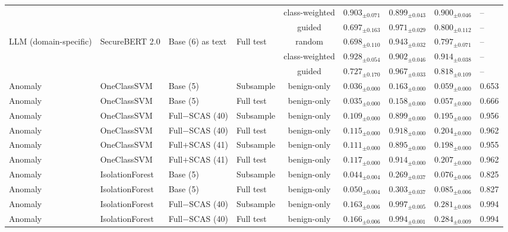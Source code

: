 \begin{longtable}{llllcccc}
 &  &  &  & class-weighted & $0.903_{\pm 0.071}$ & $0.899_{\pm 0.043}$ & $0.900_{\pm 0.046}$ & -- \\
 &  &  &  & guided & $0.697_{\pm 0.163}$ & $0.971_{\pm 0.029}$ & $0.800_{\pm 0.112}$ & -- \\
\addlinespace
LLM (domain-specific) & SecureBERT 2.0 & Base (6) as text & Full test & random & $0.698_{\pm 0.110}$ & $0.943_{\pm 0.032}$ & $0.797_{\pm 0.071}$ & -- \\
 &  &  &  & class-weighted & $0.928_{\pm 0.054}$ & $0.902_{\pm 0.046}$ & $0.914_{\pm 0.038}$ & -- \\
 &  &  &  & guided & $0.727_{\pm 0.170}$ & $0.967_{\pm 0.033}$ & $0.818_{\pm 0.109}$ & -- \\
\midrule
Anomaly & OneClassSVM & Base (5) & Subsample & benign-only & $0.036_{\pm 0.000}$ & $0.163_{\pm 0.000}$ & $0.059_{\pm 0.000}$ & 0.653 \\
\addlinespace
Anomaly & OneClassSVM & Base (5) & Full test & benign-only & $0.035_{\pm 0.000}$ & $0.158_{\pm 0.000}$ & $0.057_{\pm 0.000}$ & 0.666 \\
\addlinespace
Anomaly & OneClassSVM & Full$-$SCAS (40) & Subsample & benign-only & $0.109_{\pm 0.000}$ & $0.899_{\pm 0.000}$ & $0.195_{\pm 0.000}$ & 0.956 \\
\addlinespace
Anomaly & OneClassSVM & Full$-$SCAS (40) & Full test & benign-only & $0.115_{\pm 0.000}$ & $0.918_{\pm 0.000}$ & $0.204_{\pm 0.000}$ & 0.962 \\
\addlinespace
Anomaly & OneClassSVM & Full$+$SCAS (41) & Subsample & benign-only & $0.111_{\pm 0.000}$ & $0.895_{\pm 0.000}$ & $0.198_{\pm 0.000}$ & 0.955 \\
\addlinespace
Anomaly & OneClassSVM & Full$+$SCAS (41) & Full test & benign-only & $0.117_{\pm 0.000}$ & $0.914_{\pm 0.000}$ & $0.207_{\pm 0.000}$ & 0.962 \\
\addlinespace
Anomaly & IsolationForest & Base (5) & Subsample & benign-only & $0.044_{\pm 0.004}$ & $0.269_{\pm 0.037}$ & $0.076_{\pm 0.006}$ & 0.825 \\
\addlinespace
Anomaly & IsolationForest & Base (5) & Full test & benign-only & $0.050_{\pm 0.004}$ & $0.303_{\pm 0.037}$ & $0.085_{\pm 0.006}$ & 0.827 \\
\addlinespace
Anomaly & IsolationForest & Full$-$SCAS (40) & Subsample & benign-only & $0.163_{\pm 0.006}$ & $0.997_{\pm 0.005}$ & $0.281_{\pm 0.008}$ & 0.994 \\
\addlinespace
Anomaly & IsolationForest & Full$-$SCAS (40) & Full test & benign-only & $0.166_{\pm 0.006}$ & $0.994_{\pm 0.001}$ & $0.284_{\pm 0.009}$ & 0.994 \\

\end{longtable}
